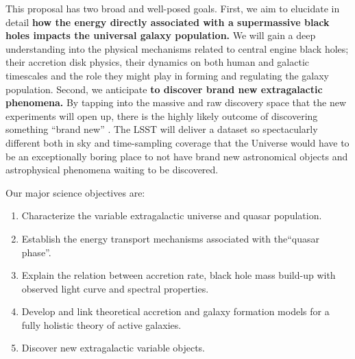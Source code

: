 \documentclass[oneside, a4paper, onecolumn, 11pt]{article}
\begin{document}
\smallskip
\smallskip
\noindent
This proposal has two broad and well-posed goals. First, we aim to elucidate in detail {\bf how the energy directly associated with a supermassive black holes impacts the universal galaxy population.} We will gain a deep understanding into the physical mechanisms related to central engine black holes; their accretion disk physics, their dynamics on both human and galactic timescales and the role they might play in forming and regulating the galaxy population. 
Second, we anticipate {\bf to discover brand new extragalactic phenomena.}  
By tapping into the massive and raw discovery space that the new experiments will open up, there is the highly likely outcome of discovering something ``brand new''  \citep{Ivezic2008, LSST_ScienceBook}. The LSST will deliver a dataset so spectacularly different both in sky and time-sampling coverage that the Universe would have to be an exceptionally boring place to not have brand new astronomical objects and astrophysical phenomena waiting to be discovered.

\smallskip
\smallskip
\noindent

\smallskip
\smallskip
\noindent
Our major science objectives are:
\begin{enumerate}
\item Characterize the variable extragalactic universe and quasar population. 
\item Establish the energy transport mechanisms associated with the``quasar phase''. 


\item Explain the relation between accretion rate, black hole mass build-up with observed light curve and spectral properties. 
\item Develop and link theoretical accretion and galaxy formation models for a fully holistic theory of active galaxies. 
\item Discover new extragalactic variable objects. 
\end{enumerate}
\end{document}

